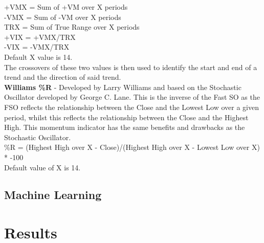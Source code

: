 \documentclass[12pt,a4paper]{article}
\begin{document}
+VMX = Sum of +VM over X periods \\
-VMX = Sum of -VM over X periods \\

TRX = Sum of True Range over X periods \\

+VIX = +VMX/TRX \\
-VIX = -VMX/TRX \\

Default X value is 14.\\

The crossovers of these two values is then used to identify the start and end of a trend and the direction of said trend.\\

\iffalse
[]
\fi

\textbf{Williams \%R} - Developed by Larry Williams and based on the Stochastic Oscillator developed by George C. Lane. This is the inverse of the Fast SO as the FSO reflects the relationship between the Close and the Lowest Low over a given period, whilst this reflects the relationship between the Close and the Highest High. This momentum indicator has the same benefits and drawbacks as the Stochastic Oscillator.\\

\%R = (Highest High over X - Close)/(Highest High over X - Lowest Low over X) * -100\\
Default value of X is 14. \\

\iffalse
[]
\fi

\iffalse
#################################################################################
\fi

\subsection*{Machine Learning}



\iffalse
#################################################################################
\fi

\section{Results}

\iffalse
this section presents the results of the solutions.  It should include information on experimental settings.  The results should demonstrate the claimed benefits/disadvantages of the proposed solutions.
This section should be between 2 to 3 pages in length.
\fi
\end{document}
